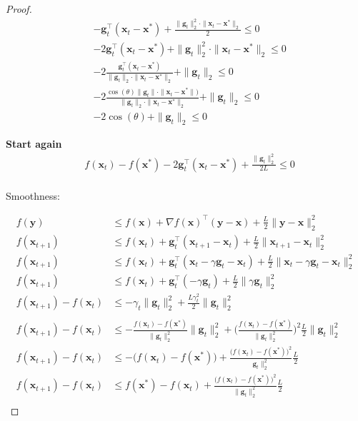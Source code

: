 \documentclass{article}
\begin{document}
\begin{proof}
	\begin{align}
		& - \mathbf{g}^\top_t(\mathbf{x}_t - \mathbf{x}^*) +\frac{\|\mathbf{g}_t\|^2_2\cdot \|\mathbf{x}_t - \mathbf{x}^*\|_2}{2}\le 0\\
		& - 2\mathbf{g}^\top_t(\mathbf{x}_t - \mathbf{x}^*) + \|\mathbf{g}_t\|^2_2\cdot \|\mathbf{x}_t - \mathbf{x}^*\|_2\le 0\\
		& - 2\frac{\mathbf{g}^\top_t(\mathbf{x}_t - \mathbf{x}^*)}{\|\mathbf{g}_t\|_2\cdot \|\mathbf{x}_t - \mathbf{x}^*\|_2} + \|\mathbf{g}_t\|_2 \le 0\\
		& - 2\frac{\cos(\theta)\|\mathbf{g}_t\|\cdot \|\mathbf{x}_t - \mathbf{x}^*\|)}{\|\mathbf{g}_t\|_2\cdot \|\mathbf{x}_t - \mathbf{x}^*\|_2} + \|\mathbf{g}_t\|_2 \le 0\\
		& - 2\cos(\theta) + \|\mathbf{g}_t\|_2 \le 0
	\end{align}


	\textbf{Start again}
	\begin{align}
		&f(\mathbf{x}_t) - f(\mathbf{x}^*)  - 2 \mathbf{g}^\top_t(\mathbf{x}_t - \mathbf{x}^*) +\frac{\|\mathbf{g}_t\|^2_2}{2L} \le 0\\
	\end{align}
	
	Smoothness:
	
	\begin{align}
		f(\mathbf{y}) &\le f(\mathbf{x}) + \nabla f(\mathbf{x})^\top(\mathbf{y}-\mathbf{x}) + \frac{L}{2}\|\mathbf{y}-\mathbf{x}\|^2_2\\
		f(\mathbf{x}_{t+1}) &\le f(\mathbf{x}_t) +\mathbf{g}_t^\top(\mathbf{x}_{t+1}-\mathbf{x}_t) + \frac{L}{2}\|\mathbf{x}_{t+1}-\mathbf{x}_t\|^2_2\\
		f(\mathbf{x}_{t+1}) &\le f(\mathbf{x}_t) +\mathbf{g}_t^\top(\mathbf{x}_t - \gamma\mathbf{g}_t-\mathbf{x}_t) + \frac{L}{2}\|\mathbf{x}_t - \gamma\mathbf{g}_t-\mathbf{x}_t\|^2_2\\
		f(\mathbf{x}_{t+1}) &\le f(\mathbf{x}_t) +\mathbf{g}_t^\top(-\gamma\mathbf{g}_t) + \frac{L}{2}\|\gamma\mathbf{g}_t\|^2_2\\
		f(\mathbf{x}_{t+1})- f(\mathbf{x}_t) &\le  - \gamma_t \|\mathbf{g}_t\|^2_2 + \frac{L\gamma_t^2}{2}\|\mathbf{g}_t\|^2_2\\\\
		f(\mathbf{x}_{t+1})- f(\mathbf{x}_t) &\le  - \frac{f(\mathbf{x}_t) - f(\mathbf{x}^*)}{\|\mathbf{g}_t\|^2_2} \|\mathbf{g}_t\|^2_2 + \bigg( \frac{f(\mathbf{x}_t) - f(\mathbf{x}^*)}{\|\mathbf{g}_t\|^2_2} \bigg)^2 \frac{L}{2}\|\mathbf{g}_t\|^2_2\\
		f(\mathbf{x}_{t+1})- f(\mathbf{x}_t) &\le  - \big( f(\mathbf{x}_t) - f(\mathbf{x}^*)\big) + \frac{\big(f(\mathbf{x}_t) - f(\mathbf{x}^*)\big)^2}{\mathbf{g}_t\|^2_2} \frac{L}{2}\\
		f(\mathbf{x}_{t+1})- f(\mathbf{x}_t) &\le f(\mathbf{x}^*) - f(\mathbf{x}_t)  + \frac{\big(f(\mathbf{x}_t) - f(\mathbf{x}^*)\big)^2}{\|\mathbf{g}_t\|^2_2} \frac{L}{2}\\
	\end{align} 
	

\end{proof}
\end{document}
